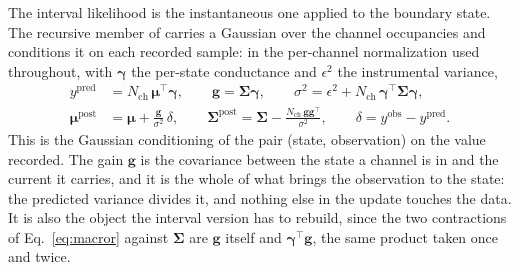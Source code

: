 The interval likelihood is the instantaneous one applied to the boundary state. The recursive
member of \citet{moffatt2007estimation} carries a Gaussian over the channel occupancies and
conditions it on each recorded sample: in the per-channel normalization used throughout, with
$\bm{\gamma}$ the per-state conductance and $\epsilon^2$ the instrumental variance,
\begin{align}
  y^{\mathrm{pred}} &= N_{\mathrm{ch}}\,\bm{\mu}^\top\bm{\gamma},
  \qquad
  \mathbf{g} = \bm{\Sigma}\bm{\gamma},
  \qquad
  \sigma^2 = \epsilon^2 + N_{\mathrm{ch}}\,\bm{\gamma}^\top\bm{\Sigma}\bm{\gamma},
  \nonumber\\
  \bm{\mu}^{\mathrm{post}} &= \bm{\mu} + \frac{\mathbf{g}}{\sigma^2}\,\delta,
  \qquad
  \bm{\Sigma}^{\mathrm{post}} = \bm{\Sigma} - \frac{N_{\mathrm{ch}}\,\mathbf{g}\mathbf{g}^\top}{\sigma^2},
  \qquad
  \delta = y^{\mathrm{obs}} - y^{\mathrm{pred}}.
  \label{eq:macror}
\end{align}
This is the Gaussian conditioning of the pair (state, observation) on the value recorded. The
gain $\mathbf{g}$ is the covariance between the state a channel is in and the current it
carries, and it is the whole of what brings the observation to the state: the predicted
variance divides it, and nothing else in the update touches the data. It is also the object
the interval version has to rebuild, since the two contractions of Eq.~\ref{eq:macror} against
$\bm{\Sigma}$ are $\mathbf{g}$ itself and $\bm{\gamma}^\top\mathbf{g}$, the same product taken once
and twice.
